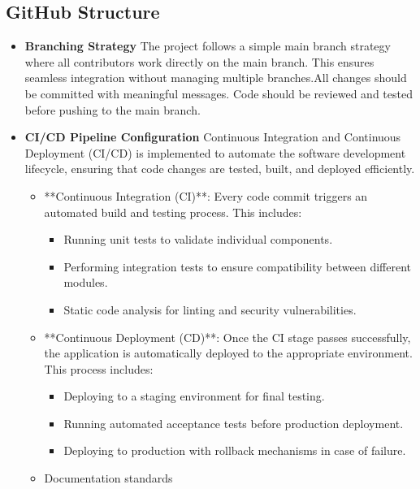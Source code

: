 \documentclass{llncs}
\begin{document}
\subsection{GitHub Structure}
\begin{itemize}
    \item \textbf{Branching Strategy}  
    The project follows a simple main branch strategy where all contributors work directly on the main branch. 
    This ensures seamless integration without managing multiple branches.All changes should be committed with meaningful messages.  
    Code should be reviewed and tested before pushing to the main branch.

    \item \textbf{CI/CD Pipeline Configuration}  
    Continuous Integration and Continuous Deployment (CI/CD) is implemented to automate the software development lifecycle, ensuring that code changes are tested, built, and deployed efficiently.  

    \begin{itemize}
        \item **Continuous Integration (CI)**:  
        Every code commit triggers an automated build and testing process. This includes:
        \begin{itemize}
            \item Running unit tests to validate individual components.
            \item Performing integration tests to ensure compatibility between different modules.
            \item Static code analysis for linting and security vulnerabilities.
        \end{itemize}

        \item **Continuous Deployment (CD)**:  
        Once the CI stage passes successfully, the application is automatically deployed to the appropriate environment. This process includes:
        \begin{itemize}
            \item Deploying to a staging environment for final testing.
            \item Running automated acceptance tests before production deployment.
            \item Deploying to production with rollback mechanisms in case of failure.
        \end{itemize}
        
    \item Documentation standards
\end{itemize}
\end{itemize}
\end{document}
